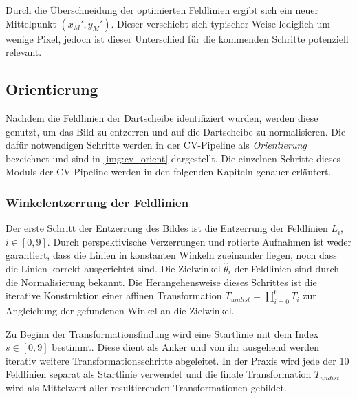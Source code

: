 Durch die Überschneidung der optimierten Feldlinien ergibt sich ein neuer Mittelpunkt $(x_M', y_M')$. Dieser verschiebt sich typischer Weise lediglich um wenige Pixel, jedoch ist dieser Unterschied für die kommenden Schritte potenziell relevant.


\subsection{Orientierung}
\label{sec:impl:cv:orient}

Nachdem die Feldlinien der Dartscheibe identifiziert wurden, werden diese genutzt, um das Bild zu entzerren und auf die Dartscheibe zu normalisieren. Die dafür notwendigen Schritte werden in der CV-Pipeline als \textit{Orientierung} bezeichnet und sind in \autoref{img:cv_orient} dargestellt. Die einzelnen Schritte dieses Moduls der CV-Pipeline werden in den folgenden Kapiteln genauer erläutert.

\subsubsection{Winkelentzerrung der Feldlinien}
\label{sec:impl:cv:orient:angles}

Der erste Schritt der Entzerrung des Bildes ist die Entzerrung der Feldlinien $L_i$, $i\in[0, 9]$. Durch perspektivische Verzerrungen und rotierte Aufnahmen ist weder garantiert, dass die Linien in konstanten Winkeln zueinander liegen, noch dass die Linien korrekt ausgerichtet sind. Die Zielwinkel $\hat{\theta}_i$ der Feldlinien sind durch die Normalisierung bekannt. Die Herangehensweise dieses Schrittes ist die iterative Konstruktion einer affinen Transformation $T_{undist} = \prod_{i=0}^{6}T_i$ zur Angleichung der gefundenen Winkel an die Zielwinkel.

Zu Beginn der Transformationsfindung wird eine Startlinie mit dem Index $s \in [0, 9]$ bestimmt. Diese dient als Anker und von ihr ausgehend werden iterativ weitere Transformationsschritte abgeleitet. In der Praxis wird jede der 10 Feldlinien separat als Startlinie verwendet und die finale Transformation $T_{undist}$ wird als Mittelwert aller resultierenden Transformationen gebildet.

